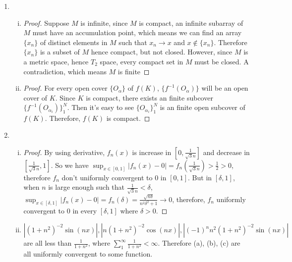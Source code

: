 \documentclass[11pt]{article}
\begin{document}
\begin{enumerate}[1]
\begin{enumerate}[(i)]
\begin{proof}
		\end{proof}
		\item
		\begin{enumerate}[(a)]
			\item $\cap_{n=1}^\infty (0, 1 + \frac{1}{n}) = (0 , 1]$ which is not open.
			\item $\{(x,x^2): x \in [0,1]\} \cap \{(x,x): x \in [0,1]\} = \{(0,0),(1,1)\}$ which is
			not connected. 
		\end{enumerate}
	\end{enumerate}
	\item
	\begin{enumerate}[(i)]
		\item 
		\begin{proof}
			Suppose $M$ is infinite, since $M$ is compact, an infinite subarray of $M$ must have an accumulation point, which means we can find an array $\{x_n\}$ of distinct elements in $M$
			such that $x_n \to x$ and $x \notin \{x_n\}$. Therefore $\{x_n\}$ is a subset of $M$ hence compact, but not closed. However, since $M$ is a metric space, hence $T_2$ space, every compact set in $M$ must be closed. A contradiction, which means $M$ is finite
		\end{proof}
		\item 
		\begin{proof}
			For every open cover $\{O_\alpha\}$ of $f(K)$, $\{f^{-1}(O_\alpha)\}$ will be an open
			cover of $K$. Since $K$ is compact, there exists an finite subcover $\{f^{-1}(O_{\alpha_i})\}_1^N$. Then it's easy to see $\{O_{\alpha_i}\}_1^N$ is an finite open subcover of $f(K)$. Therefore, $f(K)$ is compact.
		\end{proof}
	\end{enumerate}
	\item 
	\begin{enumerate}[(i)]
		\item
		\begin{proof}
			By using derivative, $f_n(x)$ is increase in $[0, \frac{1}{\sqrt{3} n}]$ and decrease in
			$[\frac{1}{\sqrt{3} n}, 1]$. So we have $\sup_{x\in[0,1]} |f_n(x) - 0| = f_n(\frac{1}{\sqrt{3} n}) > \frac{1}{2} > 0$, therefore $f_n$ don't uniformly convergent to $0$ in $[0,1]$. But in $[\delta,1]$, when $n$ is large enough such that $\frac{1}{\sqrt{3} n} < \delta$, $\sup_{x\in[\delta,1]} |f_n(x) - 0| = f_n(\delta) = \frac{\sqrt{n \delta}}{n^2 \delta^2 + 1} \to 0$, therefore, $f_n$ uniformly convergent to $0$ in every $[\delta, 1]$ where $\delta > 0$.
		\end{proof}
		\item
		$|(1+n^2)^{-2} \sin(n x)|, |n (1+n^2)^{-2} \cos(n x)|, |(-1)^n n^2 (1+n^2)^{-2} \sin(n x)|$
		are all less than $\frac{1}{1 + n^2}$, where $\sum_1^\infty \frac{1}{1 + n^2} < \infty$. Therefore (a), (b), (c) are all uniformly convergent to some function.
		

\end{enumerate}
\end{enumerate}
\end{document}
